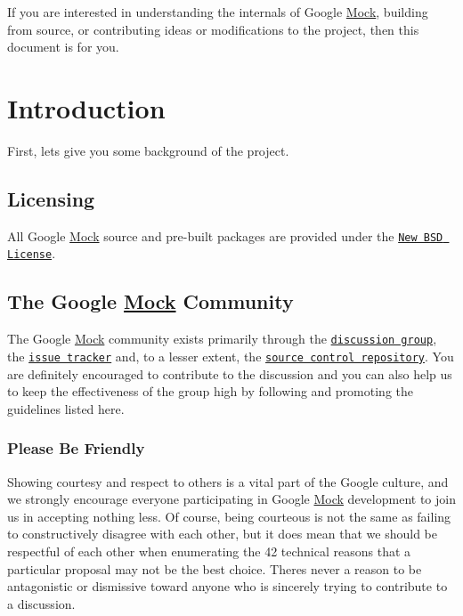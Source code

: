 If you are interested in understanding the internals of Google \hyperlink{classMock}{Mock}, building from source, or contributing ideas or modifications to the project, then this document is for you.

\section*{Introduction}

First, let\textquotesingle{}s give you some background of the project.

\subsection*{Licensing}

All Google \hyperlink{classMock}{Mock} source and pre-\/built packages are provided under the \href{http://www.opensource.org/licenses/bsd-license.php}{\tt New B\+SD License}.

\subsection*{The Google \hyperlink{classMock}{Mock} Community}

The Google \hyperlink{classMock}{Mock} community exists primarily through the \href{http://groups.google.com/group/googlemock}{\tt discussion group}, the \href{https://github.com/google/googletest/issues}{\tt issue tracker} and, to a lesser extent, the \href{../}{\tt source control repository}. You are definitely encouraged to contribute to the discussion and you can also help us to keep the effectiveness of the group high by following and promoting the guidelines listed here.

\subsubsection*{Please Be Friendly}

Showing courtesy and respect to others is a vital part of the Google culture, and we strongly encourage everyone participating in Google \hyperlink{classMock}{Mock} development to join us in accepting nothing less. Of course, being courteous is not the same as failing to constructively disagree with each other, but it does mean that we should be respectful of each other when enumerating the 42 technical reasons that a particular proposal may not be the best choice. There\textquotesingle{}s never a reason to be antagonistic or dismissive toward anyone who is sincerely trying to contribute to a discussion.


